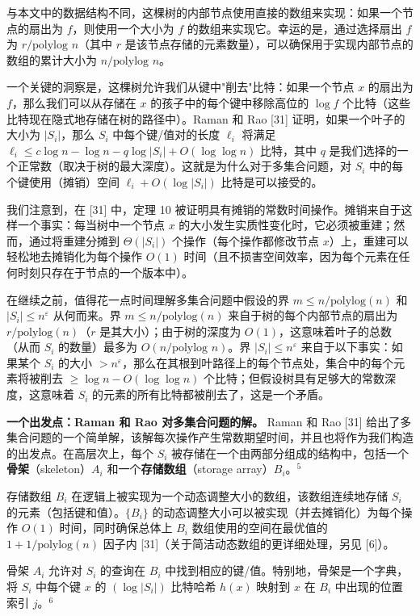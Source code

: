 \documentclass[12pt,a4paper]{ctexart}
\theoremstyle{remark}
\begin{document}
与本文中的数据结构不同，这棵树的内部节点使用直接的数组来实现：如果一个节点的扇出为 $f$，则使用一个大小为 $f$ 的数组来实现它。幸运的是，通过选择扇出 $f$ 为 $r/\text{polylog } n$（其中 $r$ 是该节点存储的元素数量），可以确保用于实现内部节点的数组的累计大小为 $n/\text{polylog } n$。

一个关键的洞察是，这棵树允许我们从键中"削去"比特：如果一个节点 $x$ 的扇出为 $f$，那么我们可以从存储在 $x$ 的孩子中的每个键中移除高位的 $\log f$ 个比特（这些比特现在隐式地存储在树的路径中）。Raman 和 Rao [31] 证明，如果一个叶子的大小为 $|S_i|$，那么 $S_i$ 中每个键/值对的长度 $\ell_i$ 将满足 $\ell_i\leq c\log n-\log n-q\log|S_i|+O(\log\log n)$ 比特，其中 $q$ 是我们选择的一个正常数（取决于树的最大深度）。这就是为什么对于多集合问题，对 $S_i$ 中的每个键使用（摊销）空间 $\ell_i+O(\log|S_i|)$ 比特是可以接受的。

我们注意到，在 [31] 中，定理 10 被证明具有摊销的常数时间操作。摊销来自于这样一个事实：每当树中一个节点 $x$ 的大小发生实质性变化时，它必须被重建；然而，通过将重建分摊到 $\Theta(|S_i|)$ 个操作（每个操作都修改节点 $x$）上，重建可以轻松地去摊销化为每个操作 $O(1)$ 时间（且不损害空间效率，因为每个元素在任何时刻只存在于节点的一个版本中）。

在继续之前，值得花一点时间理解多集合问题中假设的界 $m\leq n/\text{polylog}(n)$ 和 $|S_i|\leq n^{\varepsilon}$ 从何而来。界 $m\leq n/\text{polylog}(n)$ 来自于树的每个内部节点的扇出为 $r/\text{polylog}(n)$（$r$ 是其大小）；由于树的深度为 $O(1)$，这意味着叶子的总数（从而 $S_i$ 的数量）最多为 $O(n/\text{polylog } n)$。界 $|S_i|\leq n^{\varepsilon}$ 来自于以下事实：如果某个 $S_i$ 的大小 $>n^{\varepsilon}$，那么在其根到叶路径上的每个节点处，集合中的每个元素将被削去 $\geq\log n-O(\log\log n)$ 个比特；但假设树具有足够大的常数深度，这意味着 $S_i$ 的元素的所有比特都被削去了，这是一个矛盾。

\textbf{一个出发点：Raman 和 Rao 对多集合问题的解。} Raman 和 Rao [31] 给出了多集合问题的一个简单解，该解每次操作产生常数期望时间，并且也将作为我们构造的出发点。在高层次上，每个 $S_i$ 被存储在一个由两部分组成的结构中，包括一个\textbf{骨架}（skeleton）$A_i$ 和一个\textbf{存储数组}（storage array）$B_i$。$^5$

存储数组 $B_i$ 在逻辑上被实现为一个动态调整大小的数组，该数组连续地存储 $S_i$ 的元素（包括键和值）。$\{B_i\}$ 的动态调整大小可以被实现（并去摊销化）为每个操作 $O(1)$ 时间，同时确保总体上 $B_i$ 数组使用的空间在最优值的 $1+1/\text{polylog}(n)$ 因子内 [31]（关于简洁动态数组的更详细处理，另见 [6]）。

骨架 $A_i$ 允许对 $S_i$ 的查询在 $B_i$ 中找到相应的键/值。特别地，骨架是一个字典，将 $S_i$ 中每个键 $x$ 的 $(\log|S_i|)$ 比特哈希 $h(x)$ 映射到 $x$ 在 $B_i$ 中出现的位置索引 $j$。$^6$
\end{document}
